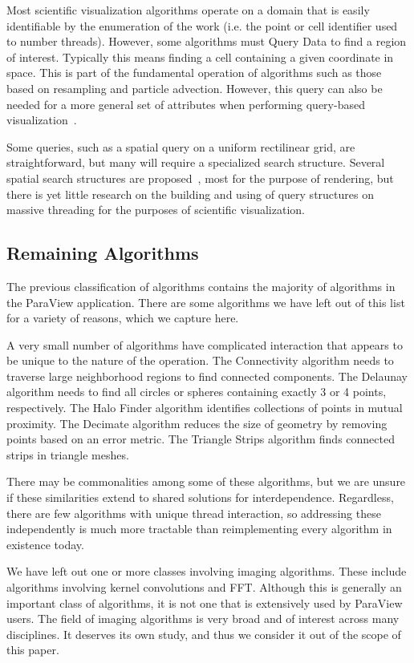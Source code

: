 \documentclass{sig-alternate}
\newcommand*{\lcite}[1]{~\cite{#1}}
\newcommand{\algclass}[1]{\textsf{#1}}
\newcommand{\alg}[1]{#1}
\newcommand{\algorithmclasssection}[1]{\subsection*{#1}}
\begin{document}
\noindent
Most scientific visualization algorithms operate on a domain that is easily
identifiable by the enumeration of the work (i.e. the point or cell
identifier used to number threads). However, some algorithms must
\algclass{Query Data} to find a region of interest. Typically this means
finding a cell containing a given coordinate in space. This is part of the
fundamental operation of algorithms such as those based on resampling and
particle advection. However, this query can also be needed for a more
general set of attributes when performing query-based
visualization\lcite{Glatter2008,Gosink2008,Johnson2009,Rubel2008}.

Some queries, such as a spatial query on a uniform rectilinear grid, are
straightforward, but many will require a specialized search
structure. Several spatial search structures are
proposed\lcite{Foley2005,Kalojanov2009,Kalojanov2011,Zhou2008,Zhou2010},
most for the purpose of rendering, but there is yet little research on the
building and using of query structures on massive threading for the
purposes of scientific visualization.


\algorithmclasssection{Remaining Algorithms}

\noindent
The previous classification of algorithms contains the majority of
algorithms in the ParaView application. There are some algorithms we have
left out of this list for a variety of reasons, which we capture here.

A very small number of algorithms have complicated interaction that appears
to be unique to the nature of the operation. The \alg{Connectivity}
algorithm needs to traverse large neighborhood regions to find connected
components. The \alg{Delaunay} algorithm needs to find all circles or
spheres containing exactly 3 or 4 points, respectively. The \alg{Halo
  Finder} algorithm identifies collections of points in mutual
proximity. The \alg{Decimate} algorithm reduces the size of geometry by
removing points based on an error metric. The \alg{Triangle Strips}
algorithm finds connected strips in triangle meshes.

There may be commonalities among some of these algorithms, but we are
unsure if these similarities extend to shared solutions for
interdependence.  Regardless, there are few algorithms with unique thread
interaction, so addressing these independently is much more tractable than
reimplementing every algorithm in existence today.

We have left out one or more classes involving imaging algorithms. These
include algorithms involving kernel convolutions and \alg{FFT}. Although
this is generally an important class of algorithms, it is not one that is
extensively used by ParaView users. The field of imaging algorithms is very
broad and of interest across many disciplines. It deserves its own study,
and thus we consider it out of the scope of this paper.
\end{document}
